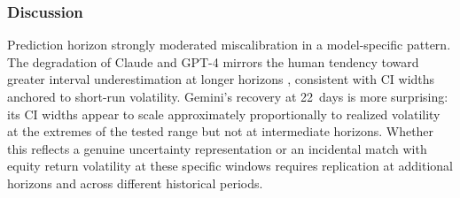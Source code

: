 \subsubsection*{Discussion}

Prediction horizon strongly moderated miscalibration in a model-specific
pattern. The degradation of Claude and GPT-4 mirrors the human tendency
toward greater interval underestimation at longer horizons \citep{Griffin1992},
consistent with CI widths anchored to short-run volatility. Gemini's
recovery at 22~days is more surprising: its CI widths appear to scale
approximately proportionally to realized volatility at the extremes of the
tested range but not at intermediate horizons. Whether this reflects a genuine
uncertainty representation or an incidental match with equity return
volatility at these specific windows requires replication at additional
horizons and across different historical periods.
